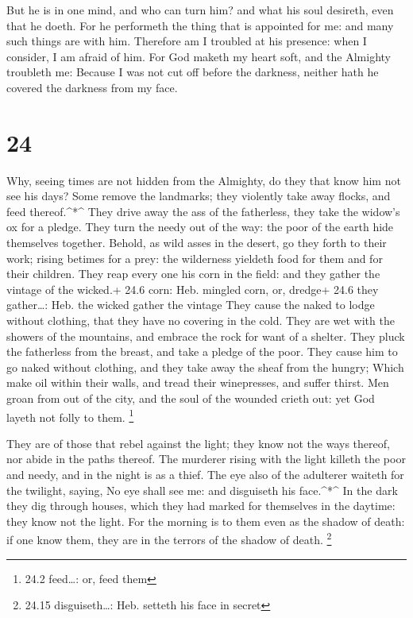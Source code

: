  But he is in one mind, and who can turn him? and what his
soul desireth, even that he doeth.  For he performeth the
thing that is appointed for me: and many such things are with him.
 Therefore am I troubled at his presence: when I consider,
I am afraid of him.  For God maketh my heart soft, and the
Almighty troubleth me:  Because I was not cut off before
the darkness, neither hath he covered the darkness from my face.

\hypertarget{section-23}{%
\section{24}\label{section-23}}

 Why, seeing times are not hidden from the Almighty, do they
that know him not see his days?  Some remove the landmarks;
they violently take away flocks, and feed thereof.\^{}*\^{} 
They drive away the ass of the fatherless, they take the widow's ox for
a pledge.  They turn the needy out of the way: the poor of
the earth hide themselves together.  Behold, as wild asses
in the desert, go they forth to their work; rising betimes for a prey:
the wilderness yieldeth food for them and for their children.
 They reap every one his corn in the field: and they gather
the vintage of the wicked.+ 24.6 corn: Heb. mingled corn, or, dredge+
24.6 they gather\ldots: Heb. the wicked gather the vintage 
They cause the naked to lodge without clothing, that they have no
covering in the cold.  They are wet with the showers of the
mountains, and embrace the rock for want of a shelter.  They
pluck the fatherless from the breast, and take a pledge of the poor.
 They cause him to go naked without clothing, and they take
away the sheaf from the hungry;  Which make oil within
their walls, and tread their winepresses, and suffer thirst.
 Men groan from out of the city, and the soul of the
wounded crieth out: yet God layeth not folly to them. \footnote{24.2
  feed\ldots: or, feed them}

 They are of those that rebel against the light; they know
not the ways thereof, nor abide in the paths thereof.  The
murderer rising with the light killeth the poor and needy, and in the
night is as a thief.  The eye also of the adulterer waiteth
for the twilight, saying, No eye shall see me: and disguiseth his
face.\^{}*\^{}  In the dark they dig through houses, which
they had marked for themselves in the daytime: they know not the light.
 For the morning is to them even as the shadow of death: if
one know them, they are in the terrors of the shadow of death.
\footnote{24.15 disguiseth\ldots: Heb. setteth his face in secret}

